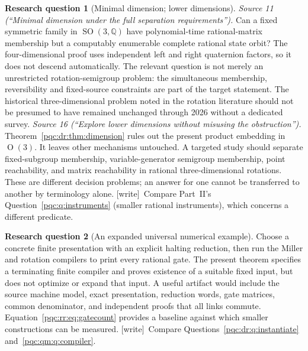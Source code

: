 \documentclass[11pt,letterpaper]{article}
\numberwithin{equation}{section}
\theoremstyle{definition}
\newtheorem{question}{Research question}
\theoremstyle{remark}
\newcommand{\Q}{\mathbb Q}
\newcommand{\wtag}{\textup{[write]}}
\newcommand{\SO}{\operatorname{SO}}
\newcommand{\OO}{\operatorname{O}}
\begin{document}
\begin{question}[Minimal dimension; lower dimensions]
\label{pqc:rr:q:dimension}\label{pqc:dr:q:dimension}
\emph{Source 11 (``Minimal dimension under the full separation requirements'').}
Can a fixed symmetric family in $\SO(3,\Q)$ have polynomial-time
rational-matrix membership but a computably enumerable complete rational
state orbit? The four-dimensional proof uses independent left and right
quaternion factors, so it does not descend automatically. The relevant
question is not merely an unrestricted rotation-semigroup problem: the
simultaneous membership, reversibility and fixed-source constraints are
part of the target statement. The historical three-dimensional problem
noted in the rotation literature should not be presumed to have remained
unchanged through 2026 without a dedicated survey.
\emph{Source 16 (``Explore lower dimensions without misusing the obstruction'').}
Theorem~\ref{pqc:dr:thm:dimension} rules out the present product embedding in
$\OO(3)$. It leaves other mechanisms untouched. A targeted study should
separate fixed-subgroup membership, variable-generator semigroup
membership, point reachability, and matrix reachability in rational
three-dimensional rotations. These are different decision problems;
an answer for one cannot be transferred to another by terminology alone.
\wtag\ Compare Part~II's Question~\ref{pqc:q:instruments} (smaller rational
instruments), which concerns a different predicate.
\end{question}

\begin{question}[An expanded universal numerical example]
\label{pqc:rr:q:example}
Choose a concrete finite presentation with an explicit halting reduction,
then run the Miller and rotation compilers to print every rational gate.
The present theorem specifies a terminating finite compiler and proves
existence of a suitable fixed input, but does not optimize or expand that
input. A useful artifact would include the source machine model, exact
presentation, reduction words, gate matrices, common denominator, and
independent proofs that all links commute. Equation~\eqref{pqc:rr:eq:gatecount}
provides a baseline against which smaller constructions can be measured.
\wtag\ Compare Questions~\ref{pqc:dr:q:instantiate} and~\ref{pqc:qm:q:compiler}.
\end{question}
\end{document}
